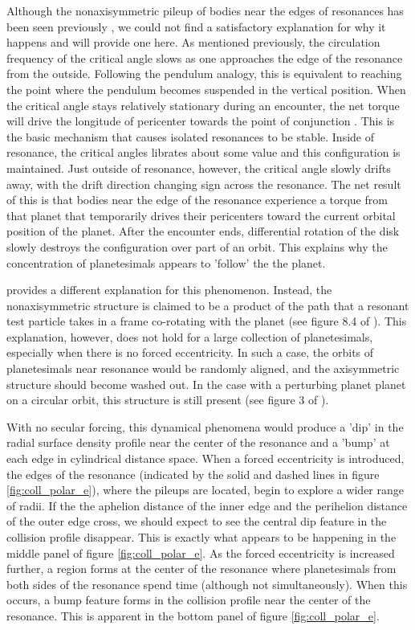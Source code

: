 \documentclass[onecolumn]{aastex63}
\begin{document}
Although the nonaxisymmetric pileup of bodies near the edges of resonances has been seen previously \citep{2000Icar..143...45R, 2016ApJ...818..159T}, we could not find a satisfactory explanation for why it happens and will provide one here. As mentioned previously, the circulation frequency of the critical angle slows as one approaches the edge of the resonance from the outside. Following the pendulum analogy, this is equivalent to reaching the point where the pendulum becomes suspended in the vertical position. When the critical angle stays relatively stationary during an encounter, the net torque will drive the longitude of pericenter towards the point of conjunction \citep{1976ARA&A..14..215P}.  This is the basic mechanism that causes isolated resonances to be stable. Inside of resonance, the critical angles librates about some value and this configuration is maintained. Just outside of resonance, however, the critical angle slowly drifts away, with the drift direction changing sign across the resonance. The net result of this is that bodies near the edge of the resonance experience a torque from that planet that temporarily drives their pericenters toward the current orbital position of the planet. After the encounter ends, differential rotation of the disk slowly destroys the configuration over part of an orbit. This explains why the concentration of planetesimals appears to 'follow' the the planet.

\citet{2016ApJ...818..159T} provides a different explanation for this phenomenon. Instead, the nonaxisymmetric structure is claimed to be a product of the path that a resonant test particle takes in a frame co-rotating with the planet (see figure 8.4 of \citet{2000ssd..book.....M}). This explanation, however, does not hold for a large collection of planetesimals, especially when there is no forced eccentricity. In such a case, the orbits of planetesimals near resonance would be randomly aligned, and the axisymmetric structure should become washed out. In the case with a perturbing planet planet on a circular orbit, this structure is still present (see figure 3 of \citet{2016ApJ...818..159T}).

With no secular forcing, this dynamical phenomena would produce a 'dip' in the radial surface density profile near the center of the resonance and a 'bump' at each edge in cylindrical distance space. When a forced eccentricity is introduced, the edges of the resonance (indicated by the solid and dashed lines in figure \ref{fig:coll_polar_e}), where the pileups are located, begin to explore a wider range of radii. If the the aphelion distance of the inner edge and the perihelion distance of the outer edge cross, we should expect to see the central dip feature in the collision profile disappear. This is exactly what appears to be happening in the middle panel of figure \ref{fig:coll_polar_e}. As the forced eccentricity is increased further, a region forms at the center of the resonance where planetesimals from both sides of the resonance spend time (although not simultaneously). When this occurs, a bump feature forms in the collision profile near the center of the resonance. This is apparent in the bottom panel of figure \ref{fig:coll_polar_e}.
\end{document}
